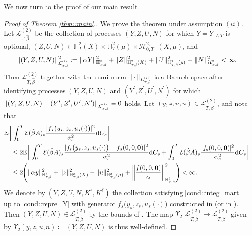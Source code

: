 \documentclass[10pt]{article} %
\newcommand\cE{\mathcal E}
\newcommand\cH{\mathcal H}
\newcommand\cL{\mathcal L}
\newcommand{\smalltext}[1]{\text{\fontsize{4}{4}\selectfont$#1$}}
\def \E{\mathbb{E}}
\def \H{\mathbb{H}}
\newcommand{\1}{\mathbf{1}}
\def\d{\mathrm{d}}
\begin{document}
We now turn to the proof of our main result.

\begin{proof}[Proof of Theorem \ref{thm::main}.]\label{proof::main}
	We prove the theorem under assumption $(ii)$. Let $\cL^{(2)}_{T,\hat\beta}$ be the collection of processes $(Y,Z,U,N)$ for which $Y = Y_{\cdot \land T}$ is optional, $(Z,U,N) \in \H^2_T(X) \times \H^2_T(\mu) \times \cH^{2,\perp}_{0,T}(X,\mu)$, and
	\begin{equation*}
		\|(Y,Z,U,N)\|^2_{\cL^\smalltext{(2)}_{\smalltext{T}\smalltext{,}\smalltext{\hat\beta}}} \coloneqq \|\alpha Y\|^2_{\H^\smalltext{2}_{\smalltext{T}\smalltext{,}\smalltext{\hat\beta}}} + \|Z\|^2_{\H^\smalltext{2}_{\smalltext{T}\smalltext{,}\smalltext{\hat\beta}}(X)} + \|U\|^2_{\H^\smalltext{2}_{\smalltext{T}\smalltext{,}\smalltext{\hat\beta}}(\mu)} + \|N\|^2_{\cH^\smalltext{2}_{\smalltext{T}\smalltext{,}\smalltext{\hat\beta}}} < \infty.
	\end{equation*}
	Then $\cL^{(2)}_{T,\hat\beta}$ together with the semi-norm $\|\cdot\|_{\cL^\smalltext{(2)}_{\smalltext{T}\smalltext{,}\smalltext{\hat\beta}}}$ is a Banach space after identifying processes $(Y,Z,U,N)$ and $(Y^\prime,Z^\prime,U^\prime,N^\prime)$ for which $\|(Y,Z,U,N) - (Y^\prime,Z^\prime,U^\prime,N^\prime)\|_{\cL^\smalltext{(2)}_{\smalltext{T}\smalltext{,}\smalltext{\hat\beta}}} = 0$ holds. Let $(y,z,u,n) \in \cL^{(2)}_{T,\hat\beta}$, and note that
	\begin{align*}
		&\E \bigg[ \int_0^T \cE(\hat\beta A)_s \frac{|f_s\big(y_s,z_s,u_s(\cdot)\big)|^2}{\alpha^2_s} \d C_s\bigg] \\ 
		&\quad\leq 2 \E \bigg[ \int_0^T \cE(\hat\beta A)_s \frac{|f_s\big(y_s,z_s,u_s(\cdot)\big) - f_s(0,0,{\bf 0})|^2}{\alpha^2_s} \d C_s 
		+ \int_0^T \cE(\hat\beta A)_s \frac{|f_s(0,0,{\bf 0})|^2}{\alpha^2_s} \d C_s \bigg] \\
		&\quad\leq 2\Bigg( \|\alpha y\|^2_{\H^\smalltext{2}_{\smalltext{T}\smalltext{,}\smalltext{\hat\beta}}} + \|z\|^2_{\H^\smalltext{2}_{\smalltext{T}\smalltext{,}\smalltext{\hat\beta}}(X)} + \|u\|^2_{\H^\smalltext{2}_{\smalltext{T}\smalltext{,}\smalltext{\hat\beta}}(\mu)} + \bigg\|\frac{f(0,0,\mathbf{0})}{\alpha}\bigg\|^2_{\H^\smalltext{2}_{\smalltext{T}\smalltext{,}\smalltext{\hat\beta}}}\Bigg) < \infty.
	\end{align*}
	We denote by $(Y,Z,U,N,K^r,K^\ell)$ the collection satisfying \ref{cond::integ_mart} up to \ref{cond::repre_Y} with generator $f_s\big(y_s,z_s,u_s(\cdot)\big)$ constructed in  (or in ). Then $(Y,Z,U,N) \in \cL^{(2)}_{T,\hat\beta}$ by the bounds of . The map $\Upsilon_2 : \cL^{(2)}_{T,\hat\beta} \longrightarrow \cL^{(2)}_{T,\hat\beta}$ given by $\Upsilon_2(y, z, u, n) \coloneqq (Y, Z, U, N)$ is thus well-defined. 
	

\end{proof}
\end{document}
